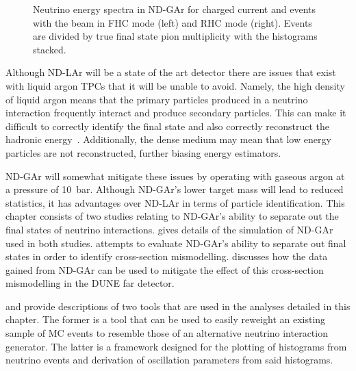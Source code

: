 \begin{figure}[h]
	\begin{minipage}[t]{.5\linewidth}
		\begin{adjustbox}{max totalsize=\linewidth, center}
				
		\end{adjustbox}
	\end{minipage}
	\hfill
	\begin{minipage}[t]{.5\linewidth}
		\begin{adjustbox}{max totalsize=\linewidth, center}
				
		\end{adjustbox}
	\end{minipage}
	\caption[Neutrino energy spectrum in ND-GAr divided by pion multiplicity]{Neutrino energy spectra in ND-GAr for charged current \numu and \anumu events with the beam in FHC mode (left) and RHC mode (right). Events are divided by true final state pion multiplicity with the histograms stacked.}
	\label{fig:energyByMode}
\end{figure}

Although ND-LAr will be a state of the art detector there are issues that exist with liquid argon TPCs that it will be unable to avoid.
Namely, the high density of liquid argon means that the primary particles produced in a neutrino interaction frequently interact and produce secondary particles.
This can make it difficult to correctly identify the final state and also correctly reconstruct the hadronic energy~\cite{Friedland_2019}.
Additionally, the dense medium may mean that low energy particles are not reconstructed, further biasing energy estimators.

ND-GAr will somewhat mitigate these issues by operating with gaseous argon at a pressure of 10~bar.
Although ND-GAr's lower target mass will lead to reduced statistics, it has advantages over ND-LAr in terms of particle identification.
This chapter consists of two studies relating to ND-GAr's ability to separate out the final states of neutrino interactions.
 gives details of the simulation of ND-GAr used in both studies.
 attempts to evaluate ND-GAr's ability to separate out final states in order to identify cross-section mismodelling.
 discusses how the data gained from ND-GAr can be used to mitigate the effect of this cross-section mismodelling in the DUNE far detector.

 and  provide descriptions of two tools that are used in the analyses detailed in this chapter.
The former is a tool that can be used to easily reweight an existing sample of MC events to resemble those of an alternative neutrino interaction generator.
The latter is a framework designed for the plotting of histograms from neutrino events and derivation of oscillation parameters from said histograms.

